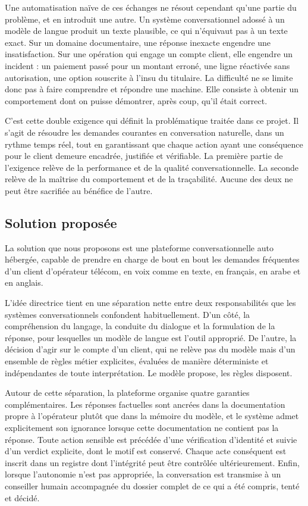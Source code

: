 Une automatisation naïve de ces échanges ne résout cependant qu'une partie du problème, et en introduit une autre. Un système conversationnel adossé à un modèle de langue produit un texte plausible, ce qui n'équivaut pas à un texte exact. Sur un domaine documentaire, une réponse inexacte engendre une insatisfaction. Sur une opération qui engage un compte client, elle engendre un incident : un paiement passé pour un montant erroné, une ligne réactivée sans autorisation, une option souscrite à l'insu du titulaire. La difficulté ne se limite donc pas à faire comprendre et répondre une machine. Elle consiste à obtenir un comportement dont on puisse démontrer, après coup, qu'il était correct.

C'est cette double exigence qui définit la problématique traitée dans ce projet. Il s'agit de résoudre les demandes courantes en conversation naturelle, dans un rythme temps réel, tout en garantissant que chaque action ayant une conséquence pour le client demeure encadrée, justifiée et vérifiable. La première partie de l'exigence relève de la performance et de la qualité conversationnelle. La seconde relève de la maîtrise du comportement et de la traçabilité. Aucune des deux ne peut être sacrifiée au bénéfice de l'autre.

\subsection{Solution proposée}

La solution que nous proposons est une plateforme conversationnelle auto hébergée, capable de prendre en charge de bout en bout les demandes fréquentes d'un client d'opérateur télécom, en voix comme en texte, en français, en arabe et en anglais.

L'idée directrice tient en une séparation nette entre deux responsabilités que les systèmes conversationnels confondent habituellement. D'un côté, la compréhension du langage, la conduite du dialogue et la formulation de la réponse, pour lesquelles un modèle de langue est l'outil approprié. De l'autre, la décision d'agir sur le compte d'un client, qui ne relève pas du modèle mais d'un ensemble de règles métier explicites, évaluées de manière déterministe et indépendantes de toute interprétation. Le modèle propose, les règles disposent.

Autour de cette séparation, la plateforme organise quatre garanties complémentaires. Les réponses factuelles sont ancrées dans la documentation propre à l'opérateur plutôt que dans la mémoire du modèle, et le système admet explicitement son ignorance lorsque cette documentation ne contient pas la réponse. Toute action sensible est précédée d'une vérification d'identité et suivie d'un verdict explicite, dont le motif est conservé. Chaque acte conséquent est inscrit dans un registre dont l'intégrité peut être contrôlée ultérieurement. Enfin, lorsque l'autonomie n'est pas appropriée, la conversation est transmise à un conseiller humain accompagnée du dossier complet de ce qui a été compris, tenté et décidé.

